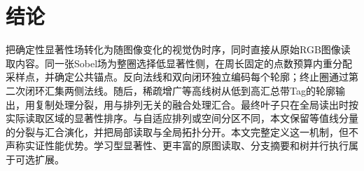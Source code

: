 \section{结论}

\method{}把确定性显著性场转化为随图像变化的视觉伪时序，同时直接从原始RGB图像读取内容。同一张Sobel场为整圈选择低显著性侧，在周长固定的点数预算内重分配采样点，并确定公共锚点。反向法线和双向闭环独立编码每个轮廓；终止圈通过第二次闭环汇集两侧法线。随后，稀疏增广等高线树从低到高汇总带Tag的轮廓输出，用复制处理分裂，用与排列无关的融合处理汇合。最终叶子只在全局读出时按实际读取区域的显著性排序。与自适应排列或空间分区不同，本文保留等值线分量的分裂与汇合演化，并把局部读取与全局拓扑分开。本文完整定义这一机制，但不声称实证性能优势。学习型显著性、更丰富的原图读取、分支摘要和树并行执行属于可选扩展。
